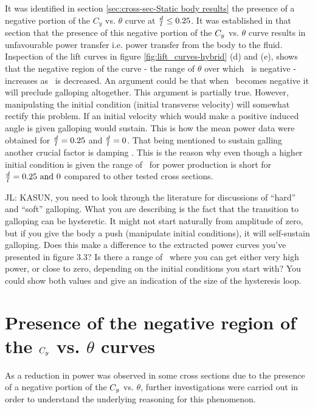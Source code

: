 It was identified in section \ref{sec:cross-sec-Static body results} the presence of a negative portion of the $C_y$ vs. $\theta$ curve at $\frac{d}{l}\leq0.25$. It was established in that section that the presence of this negative portion of the $C_{y}$ vs. $\theta$ curve results in unfavourable power transfer i.e. power transfer from the body to the fluid. Inspection of the lift curves in figure \ref{fig:lift_curves-hybrid} (d) and (e), shows that the negative region of the curve - the range of $\theta$ over which \cy\ is negative - increases as \ratio\ is decreased. An argument could be that when \cy\ becomes negative it will preclude galloping altogether. This argument is partially true. However, manipulating the initial condition (initial transverse velocity) will somewhat rectify this problem. If an initial velocity which would make a positive induced angle is given galloping would sustain. This is how the mean power data were obtained for $\frac{d}{l}=0.25$ and $\frac{d}{l}=0$. That being mentioned to sustain galling another crucial factor is damping \citet{Paidoussis2010}. This is the reason why even though a higher initial condition is given the range of \massdamp\ for power production is short for $\ratio=0.25\ \text{and}\ 0$ compared to other tested cross sections. 

JL: KASUN, you need to look through the literature for discussions of ``hard'' and ``soft'' galloping. What you are describing is the fact that the transition to galloping can be hysteretic. It might not start naturally from amplitude of zero, but if you give the body a push (manipulate initial conditions), it will self-sustain galloping. Does this make a difference to the extracted power curves you've presented in figure 3.3? Is there a range of \massdamp\ where you can get either very high power, or close to zero, depending on the initial conditions you start with? You could show both values and give an indication of the size of the hysteresis loop.

\section{Presence of the negative region of the $C_{y}$ vs. $\theta$ curves}
 \label{sec:negative-region}

As a reduction in power was observed in some cross sections due to the presence of a negative portion of the $C_{y}$ vs. $\theta$, further investigations were carried out in order to understand the underlying reasoning for this phenomenon.

